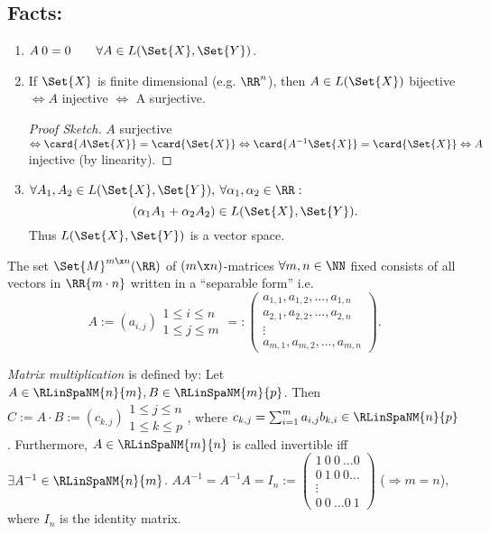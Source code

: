 \subsection*{Facts:}
\begin{enumerate}
 \item $A\:0=0\qquad\forall A\in L(\Set{X}, \Set{Y})$. 
 \item If $\Set{X}$ is finite dimensional (e.g. $\RR^n$), then $A\in L(\Set{X})$ bijective $\Leftrightarrow A$ injective $\Leftrightarrow$ A surjective.
 \begin{proof}[Proof Sketch]
  $A$ surjective $\Leftrightarrow \card{A \Set{X}}=\card{\Set{X}}\Leftrightarrow \card{A^{-1} \Set{X}}=\card{\Set{X}}\Leftrightarrow A$ injective (by linearity). 
 \end{proof}
 \item $\forall A_1, A_2\in L(\Set{X},\Set{Y}), \:\forall\alpha_1, \alpha_2\in\RR:$
 $$(\alpha_1 A_1+\alpha_2 A_2)\in L(\Set{X}, \Set{Y}).$$
 Thus $L(\Set{X},\Set{Y})$ is a vector space.
\end{enumerate}
\begin{defn}
 The set $\Set{M}^{m\x n}(\RR)$ of $(m\x n)$-matrices $\forall m,n\in\NN$ fixed consists of all vectors in $\RR{m\cdot n}$ written in a ``separable form'' i.e. $$A:=(a_{i,j})\begin{matrix}1\leq i\leq n\\1\leq j\leq m\end{matrix}=:\left(\begin{matrix}a_{1,1}, a_{1,2},\ldots, a_{1,n}\\a_{2,1}, a_{2,2},\ldots, a_{2,n}\\\vdots\\ a_{m,1}, a_{m,2},\ldots, a_{m,n}\end{matrix}\right).$$
\end{defn}
\begin{defn}
 \emph{Matrix multiplication} is defined by:
 Let $A\in\RLinSpaNM{n}{m}, B\in\RLinSpaNM{m}{p}$. Then $C:= A\cdot B:=(c_{k,j})\begin{matrix}1\leq j\leq n\\1\leq k\leq p\end{matrix}$, where $c_{k,j}=\sum_{i=1}^{m}a_{i,j}b_{k,i}\in\RLinSpaNM{n}{p}$. Furthermore, $A\in\RLinSpaNM{m}{n}$ is called invertible iff $\exists A^{-1}\in\RLinSpaNM{n}{m}$. $AA^{-1}=A^{-1}A=I_n:=\left(\begin{matrix}1\ 0\ 0\ \ldots 0\\0\ 1\ 0\ 0\ldots\\\vdots\\0\ 0\ \ldots 0\ 1\end{matrix}\right)$ ($\Rightarrow m=n$), where $I_n$ is the identity matrix.
\end{defn}
